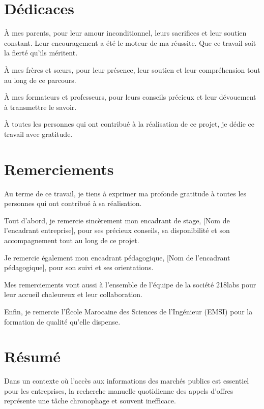 \documentclass[12pt,a4paper]{report}
\begin{document}
\chapter*{Dédicaces}

À mes parents, pour leur amour inconditionnel, leurs sacrifices et leur soutien constant. Leur encouragement a été le moteur de ma réussite. Que ce travail soit la fierté qu'ils méritent.

À mes frères et sœurs, pour leur présence, leur soutien et leur compréhension tout au long de ce parcours.

À mes formateurs et professeurs, pour leurs conseils précieux et leur dévouement à transmettre le savoir.

À toutes les personnes qui ont contribué à la réalisation de ce projet, je dédie ce travail avec gratitude.

\chapter*{Remerciements}

Au terme de ce travail, je tiens à exprimer ma profonde gratitude à toutes les personnes qui ont contribué à sa réalisation.

Tout d'abord, je remercie sincèrement mon encadrant de stage, [Nom de l'encadrant entreprise], pour ses précieux conseils, sa disponibilité et son accompagnement tout au long de ce projet.

Je remercie également mon encadrant pédagogique, [Nom de l'encadrant pédagogique], pour son suivi et ses orientations.

Mes remerciements vont aussi à l'ensemble de l'équipe de la société 218labs pour leur accueil chaleureux et leur collaboration.

Enfin, je remercie l'École Marocaine des Sciences de l'Ingénieur (EMSI) pour la formation de qualité qu'elle dispense.

\chapter*{Résumé}

Dans un contexte où l'accès aux informations des marchés publics est essentiel pour les entreprises, la recherche manuelle quotidienne des appels d'offres représente une tâche chronophage et souvent inefficace.
\end{document}
